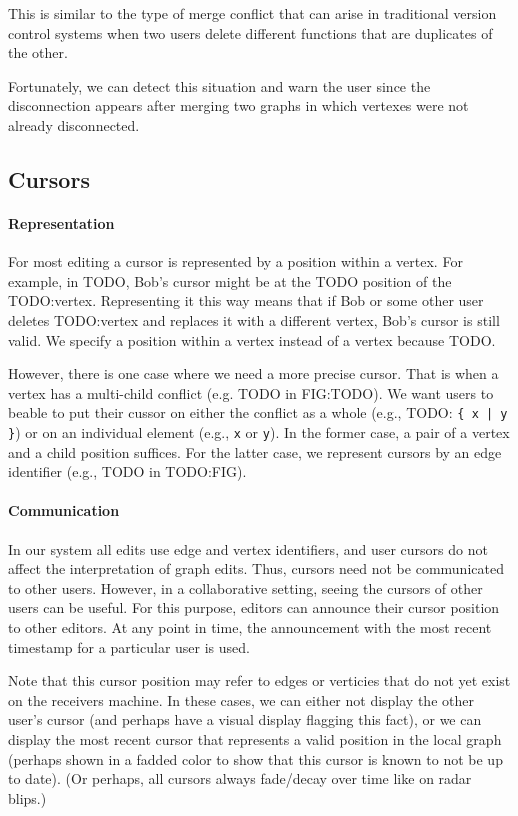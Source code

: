 This is similar to the type of merge conflict
that can arise in traditional version control systems
when two users delete different functions that
are duplicates of the other.

Fortunately, we can detect this situation and warn the user
since the disconnection appears after merging two graphs
in which vertexes were not already disconnected.

\subsection{Cursors}%
\label{sub:Cursors}

\paragraph{Representation}

For most editing a cursor is represented by a position within a vertex.
For example, in TODO, Bob's cursor might be at the TODO position of the TODO:vertex.
Representing it this way means that if Bob or some other user deletes TODO:vertex
and replaces it with a different vertex, Bob's cursor is still valid.
We specify a position within a vertex instead of a vertex because TODO.

However, there is one case where we need a more precise cursor.
That is when a vertex has a multi-child conflict (e.g. TODO in FIG:TODO).
We want users to beable to put their cussor on either the conflict as a whole
(e.g., TODO: \texttt{\{ x | y \}})
or on an individual element (e.g., \texttt{x} or \texttt{y}).
In the former case, a pair of a vertex and a child position suffices.
For the latter case, we represent cursors by an edge identifier (e.g., TODO in TODO:FIG).

\paragraph{Communication}

In our system all edits use edge and vertex identifiers, and user
cursors do not affect the interpretation of graph edits.
Thus, cursors need not be communicated to other users.
However, in a collaborative setting, seeing the cursors of other users
can be useful.
For this purpose, editors can announce their cursor position to other editors.
At any point in time, the announcement
with the most recent timestamp
for a particular user
is used.

Note that this cursor position may refer to edges or verticies that
do not yet exist on the receivers machine.
In these cases, we can either not display the other user's cursor (and perhaps
have a visual display flagging this fact), or we can display the most recent
cursor that represents a valid position in the local graph (perhaps
shown in a fadded color to show that this cursor is known to not be up to date).
(Or perhaps, all cursors always fade/decay over time like on radar blips.)
